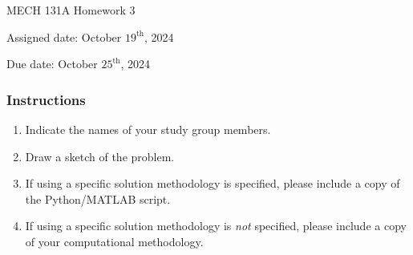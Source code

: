 \documentclass[12pt,letterpaper]{article}
\begin{document}
\noindent
MECH 131A Homework 3

\noindent
Assigned date: October $19^{\mathrm{th}}$, 2024

\noindent
Due date: October $25^{\mathrm{th}}$, 2024

\subsubsection*{Instructions}
\begin{enumerate}
	\item Indicate the names of your study group members.
	\item Draw a sketch of the problem.
	\item If using a specific solution methodology is specified, please include a copy of the Python/MATLAB script.
	\item If using a specific solution methodology is \textit{not} specified, please include a copy of your computational methodology.
\end{enumerate}
\end{document}
